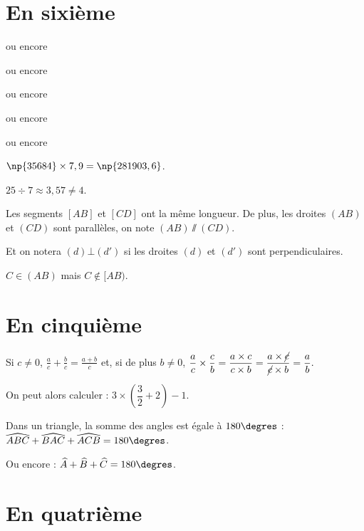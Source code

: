 \documentclass[10pt,french]{article}
\begin{document}
\section{En sixième}

\quad ou encore \medskip

 \quad ou encore \medskip

\quad
ou encore \medskip

 \quad ou encore  \medskip

 \quad ou encore \medskip

$\np{35684} \times 7,9 = \np{281903,6}$.\medskip

$25 \div 7 \approx 3,57 \neq 4$.\medskip

Les segments $[AB]$ et $[CD]$ ont la même longueur.
De plus, les droites $(AB)$ et $(CD)$ sont parallèles, on note $(AB) \varparallel (CD)$.\par
Et on notera $(d) \bot (d')$ si les droites $(d)$ et $(d')$ sont perpendiculaires.\medskip

$C \in (AB)$ mais $C \notin [AB)$.

\section{En cinquième}

Si $c \neq 0$, $\frac{a}{c} + \frac{b}{c} = \frac{a+b}{c}$ et, si de plus
$b \neq 0$, $\dfrac{a}{c} \times \dfrac{c}{b} = \dfrac{a \times c}{c \times b}
=\dfrac{a \times \cancel{c}}{\cancel{c}\times b} = \dfrac a b.$\medskip

On peut alors calculer : $3 \times \left(\dfrac 3 2 + 2\right) - 1$.\medskip

Dans un triangle, la somme des angles est égale à $180\degres$ :
$\widehat{ABC} + \widehat{BAC} + \widehat{ACB}= 180\degres$.\par
Ou encore : $\widehat A + \widehat B + \widehat C = 180\degres$.

\section{En quatrième}
\end{document}
